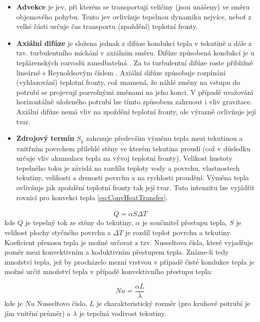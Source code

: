 \begin{itemize}
  \item
    \textbf{Advekce} je jev, při kterém se transportují veličiny (jsou unášeny)
    ve směru objemového pohybu. Tento jev ovlivňuje tepelnou dynamiku nejvíce,
    neboť z velké části určuje čas transportu (zpoždění) teplotní fronty.
  \item
    \textbf{Axiální difúze} je složena jednak z difúze kondukcí tepla v
    tekutině a dále z tzv. turbulentního míchání v axiálním směru. Difúze
    způsobená kondukcí je u teplárenských rozvodů zanedbatelná
    \cite{VanderHeijde2017a,VanderHeijde2017b}. Za to turbulentní difúze roste
    přibližně lineárně s Reynoldsovým číslem \cite{Chertkov2018}. Axiální
    difúze způsobuje rozpínání (vyhlazování) teplotní fronty, což znamená,
    že náhlé změny na vstupu do potrubí se projevují pozvolnými změnami na jeho
    konci. V případě uvažování horizontálně uloženého potrubí lze tímto
    způsobem zahrnout i vliv gravitace. Axiální difúze nemá vliv na zpoždění
    teplotní fronty, ale výrazně ovlivňuje její tvar.
  \item
    \textbf{Zdrojový termín} \(S_y\) zahrnuje především výměnu tepla mezi
    tekutinou a vnitřním povrchem přilehlé stěny ve kterém tekutina proudí (což
    v důsledku určuje vliv akumulace tepla na vývoj teplotní fronty). Velikost
    hustoty tepelného toku je závislá na rozdílu teploty vody a povrchu,
    vlastnostech tekutiny, velikosti a drsnosti povrchu a na rychlosti
    proudění. Výměna tepla ovlivňuje jak zpoždění teplotní fronty tak její
    tvar. Tuto intenzitu lze vyjádřit rovnicí pro konvekci tepla
    \ref{eq:ConvHeatTransfer}.
\end{itemize}

\begin{equation}
  \label{eq:ConvHeatTransfer}
  \dot{Q} = \alpha S \Delta T
\end{equation}
kde \(\dot{Q}\) je tepelný tok ze stěny do tekutiny, \(\alpha\) je součinitel
přestupu tepla, \(S\) je velikost plochy styčného povrchu a \(\Delta T\) je
rozdíl teplot povrchu a tekutiny. Koeficient přenosu tepla  je možné určovat z
tzv. Nusseltova čísla, které vyjadřuje poměr mezi konvektivním a koduktivním
přestupem tepla. Známe-li tedy množství tepla, jež by procházelo mezní vrstvou
v případě čisté kondukce tepla je možné určit množství tepla v případě
konvektivního přestupu tepla:

\begin{equation}
  \label{eq:NusseltDef}
  Nu = \frac{\alpha L}{\lambda}
\end{equation}
kde je \(Nu\) Nusseltovo číslo, \(L\) je charakteristický rozměr (pro kruhové
potrubí je jím vnitřní průměr) a \(\lambda\) je tepelná vodivost tekutiny.

